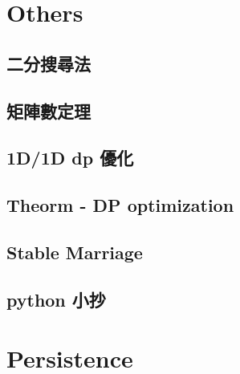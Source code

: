 \section{Others}

\subsection{二分搜尋法}

\subsection{矩陣數定理}

\subsection{1D/1D dp 優化}

\subsection{Theorm - DP optimization}

\subsection{Stable Marriage}

\subsection{python 小抄}



\section{Persistence}

